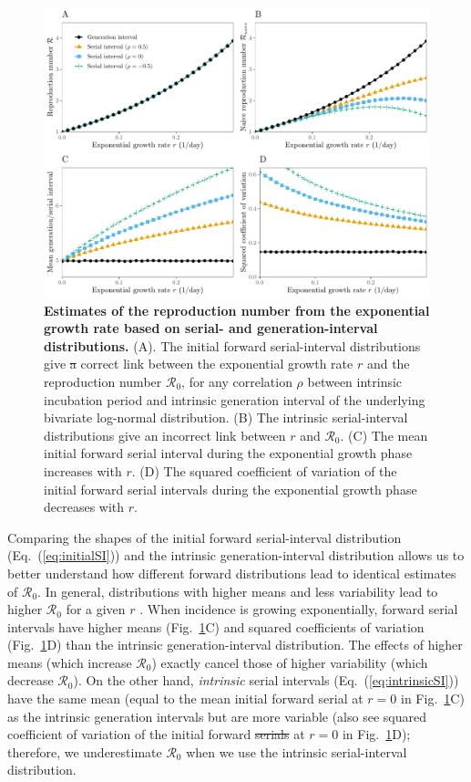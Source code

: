\documentclass[12pt]{article}
\newcommand{\eref}[1]{Eq.~(\ref{eq:#1})}
\newcommand{\fref}[1]{Fig.~\ref{fig:#1}}
\newcommand{\Rx}[1]{\ensuremath{{\mathcal R}_{#1}}\xspace}
\newcommand{\Ro}{\Rx{0}}
\providecommand{\DIFaddtex}[1]{{\protect\color{blue}\uwave{#1}}} %
\providecommand{\DIFdeltex}[1]{{\protect\color{red}\sout{#1}}}                      %
\providecommand{\DIFaddbegin}{} %
\providecommand{\DIFaddend}{} %
\providecommand{\DIFdelbegin}{} %
\providecommand{\DIFdelend}{} %
\providecommand{\DIFaddFL}[1]{\DIFadd{#1}} %
\providecommand{\DIFdelFL}[1]{\DIFdel{#1}} %
\providecommand{\DIFaddbeginFL}{} %
\providecommand{\DIFaddendFL}{} %
\providecommand{\DIFdelbeginFL}{} %
\providecommand{\DIFdelendFL}{} %
\providecommand{\DIFadd}[1]{\texorpdfstring{\DIFaddtex{#1}}{#1}} %
\providecommand{\DIFdel}[1]{\texorpdfstring{\DIFdeltex{#1}}{}} %
\newcommand{\DIFscaledelfig}{0.5}
\newlength{\DIFdelgraphicswidth} %
\newlength{\DIFdelgraphicsheight} %
\newcommand{\DIFaddincludegraphics}[2][]{{\color{blue}\fbox{\DIFOincludegraphics[#1]{#2}}}} %
\newcommand{\DIFdelincludegraphics}[2][]{%
\sbox{\DIFdelgraphicsbox}{\DIFOincludegraphics[#1]{#2}}%
\settoboxwidth{\DIFdelgraphicswidth}{\DIFdelgraphicsbox} %
\settoboxtotalheight{\DIFdelgraphicsheight}{\DIFdelgraphicsbox} %
\scalebox{\DIFscaledelfig}{%
\parbox[b]{\DIFdelgraphicswidth}{\usebox{\DIFdelgraphicsbox}\\[-\baselineskip] \rule{\DIFdelgraphicswidth}{0em}}\llap{\resizebox{\DIFdelgraphicswidth}{\DIFdelgraphicsheight}{%
\setlength{\unitlength}{\DIFdelgraphicswidth}%
\begin{picture}(1,1)%
\thicklines\linethickness{2pt} %
{\color[rgb]{1,0,0}\put(0,0){\framebox(1,1){}}}%
{\color[rgb]{1,0,0}\put(0,0){\line( 1,1){1}}}%
{\color[rgb]{1,0,0}\put(0,1){\line(1,-1){1}}}%
\end{picture}%
}\hspace*{3pt}}} %
} %
\DeclareRobustCommand{\DIFaddbegin}{\DIFOaddbegin \let\includegraphics\DIFaddincludegraphics} %
\DeclareRobustCommand{\DIFaddend}{\DIFOaddend \let\includegraphics\DIFOincludegraphics} %
\DeclareRobustCommand{\DIFdelbegin}{\DIFOdelbegin \let\includegraphics\DIFdelincludegraphics} %
\DeclareRobustCommand{\DIFdelend}{\DIFOaddend \let\includegraphics\DIFOincludegraphics} %
\DeclareRobustCommand{\DIFaddbeginFL}{\DIFOaddbeginFL \let\includegraphics\DIFaddincludegraphics} %
\DeclareRobustCommand{\DIFaddendFL}{\DIFOaddendFL \let\includegraphics\DIFOincludegraphics} %
\DeclareRobustCommand{\DIFdelbeginFL}{\DIFOdelbeginFL \let\includegraphics\DIFdelincludegraphics} %
\DeclareRobustCommand{\DIFdelendFL}{\DIFOaddendFL \let\includegraphics\DIFOincludegraphics} %
\begin{document}
\begin{figure}[!th]
\includegraphics[width=\textwidth]{rR.pdf}
\caption{
\textbf{Estimates of the reproduction number from the exponential growth rate based on serial- and generation-interval distributions.}
(A). The initial forward serial-interval distributions give \DIFdelbeginFL \DIFdelFL{a }\DIFdelendFL \DIFaddbeginFL \DIFaddFL{the }\DIFaddendFL correct
link between the exponential growth rate $r$ and the reproduction
number \Ro,
for any correlation $\rho$ between intrinsic incubation period and
intrinsic generation interval of the underlying bivariate log-normal distribution.
(B) The intrinsic serial-interval distributions give an incorrect link between $r$ and \Ro.
(C) The mean initial forward serial interval during the exponential growth phase increases with $r$.
(D) The squared coefficient of variation of the initial forward serial intervals during the exponential growth phase decreases with $r$.
}
\label{fig:rR}
\end{figure}

Comparing the shapes of the initial forward serial-interval distribution (\eref{initialSI}) and the intrinsic generation-interval distribution allows us to better understand how different forward distributions lead to identical estimates of \Ro.
In general, distributions with higher means and less variability lead to higher \Ro for a given $r$ \citep{wallinga2007generation, weitz2015modeling, park2019practical}.
When incidence is growing exponentially, forward serial intervals have higher means (\fref{rR}C) and squared coefficients of variation (\fref{rR}D) than the intrinsic generation-interval distribution.
The effects of higher means (which increase \Ro) exactly cancel those of higher variability (which decrease \Ro).
On the other hand, \emph{intrinsic} serial intervals (\eref{intrinsicSI}) have the same mean (equal to the mean initial forward serial at $r=0$ in \fref{rR}C) as the intrinsic generation intervals but are more variable (also see squared coefficient of variation of the initial forward \DIFdelbegin \DIFdel{serials }\DIFdelend \DIFaddbegin \DIFadd{serial-interval distribution }\DIFaddend at $r=0$ in \fref{rR}D); 
therefore, we underestimate \Ro when we use the intrinsic serial-interval distribution.
\end{document}
